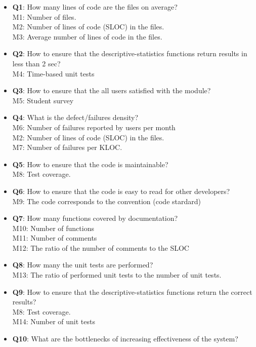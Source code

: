\documentclass[12pt]{article}
\begin{document}
\begin{itemize}
    \item \textbf{Q1}: How many lines of code are the files on average?\\
     M1: Number of files.\\
     M2: Number of lines of code (SLOC) in the files.\\
     M3: Average number of lines of code in the files. 
    \item \textbf{Q2}: How to ensure that the descriptive-statistics functions return results in less than 2 sec? \\
     M4: Time-based unit tests
    \item \textbf{Q3}: How to ensure that the all users satisfied with the module?\\
     M5: Student survey
    \item \textbf{Q4}: What is the defect/failures density?\\
     M6: Number of failures reported by users per month\\
     M2: Number of lines of code (SLOC) in the files.\\
     M7: Number of failures per KLOC.
    \item \textbf{Q5}: How to ensure that the code is maintainable?\\
     M8: Test coverage.
    \item \textbf{Q6}: How to ensure that the code is easy to read for other developers?\\
     M9: The code corresponds to the convention (code stardard)
    \item \textbf{Q7}: How many functions covered by documentation?\\
     M10: Number of functions\\
     M11: Number of comments\\
     M12: The ratio of the number of comments to the SLOC
    \item \textbf{Q8}: How many the unit tests are performed?\\
     M13: The ratio of performed unit tests to the number of unit tests.
    \item \textbf{Q9}: How to ensure that the descriptive-statistics functions return the correct results?\\
     M8: Test coverage.\\
     M14: Number of unit tests 
    \item \textbf{Q10}: What are the bottlenecks of increasing effectiveness of the system?\\

\end{itemize}
\end{document}
